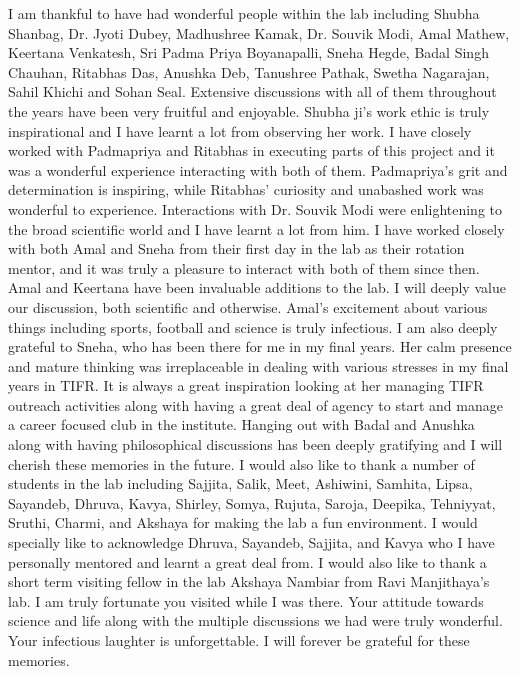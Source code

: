 I am thankful to have had wonderful people within the lab including Shubha Shanbag, Dr. Jyoti Dubey, Madhushree Kamak, Dr. Souvik Modi, Amal Mathew, Keertana Venkatesh, Sri Padma Priya Boyanapalli, Sneha Hegde, Badal Singh Chauhan, Ritabhas Das, Anushka Deb, Tanushree Pathak, Swetha Nagarajan, Sahil Khichi and Sohan Seal. Extensive discussions with all of them throughout the years have been very fruitful and enjoyable. Shubha ji's work ethic is truly inspirational and I have learnt a lot from observing her work. I have closely worked with Padmapriya and Ritabhas in executing parts of this project and it was a wonderful experience interacting with both of them. Padmapriya's grit and determination is inspiring, while Ritabhas' curiosity and unabashed work was wonderful to experience. Interactions with Dr. Souvik Modi were enlightening to the broad scientific world and I have learnt a lot from him. I have worked closely with both Amal and Sneha from their first day in the lab as their rotation mentor, and it was truly a pleasure to interact with both of them since then. Amal and Keertana have been invaluable additions to the lab. I will deeply value our discussion, both scientific and otherwise. Amal's excitement about various things including sports, football and science is truly infectious. I am also deeply grateful to Sneha, who has been there for me in my final years. Her calm presence and mature thinking was irreplaceable in dealing with various stresses in my final years in TIFR. It is always a great inspiration looking at her managing TIFR outreach activities along with having a great deal of agency to start and manage a career focused club in the institute. Hanging out with Badal and Anushka along with having philosophical discussions has been deeply gratifying and I will cherish these memories in the future. I would also like to thank a number of students in the lab including Sajjita, Salik, Meet, Ashiwini, Samhita, Lipsa, Sayandeb, Dhruva, Kavya, Shirley, Somya, Rujuta, Saroja, Deepika, Tehniyyat, Sruthi, Charmi, and Akshaya for making the lab a fun environment. I would specially like to acknowledge Dhruva, Sayandeb, Sajjita, and Kavya who I have personally mentored and learnt a great deal from. I would also like to thank a short term visiting fellow in the lab Akshaya Nambiar from Ravi Manjithaya's lab. I am truly fortunate you visited while I was there. Your attitude towards science and life along with the multiple discussions we had were truly wonderful. Your infectious laughter is unforgettable. I will forever be grateful for these memories.

